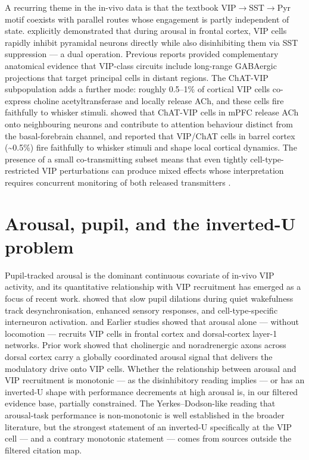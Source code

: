 \documentclass[11pt]{article}
\let\origrightarrow\rightarrow
\def\rightarrow{\ensuremath{\origrightarrow}}
\begin{document}
A recurring theme in the in-vivo data is that the textbook VIP\rightarrow SST\rightarrow Pyr motif coexists with parallel routes whose engagement is partly independent of state. \citet{Garciajuncoclemente2017} explicitly demonstrated that during arousal in frontal cortex, VIP cells rapidly inhibit pyramidal neurons directly while also disinhibiting them via SST suppression --- a dual operation. Previous reports \citep{Lee2014b} provided complementary anatomical evidence that VIP-class circuits include long-range GABAergic projections that target principal cells in distant regions. The ChAT-VIP subpopulation \citep{Dudai2020, Granger2020} adds a further mode: roughly 0.5--1\% of cortical VIP cells co-express choline acetyltransferase and locally release ACh, and these cells fire faithfully to whisker stimuli. \citet{Obermayer2019} showed that ChAT-VIP cells in mPFC release ACh onto neighbouring neurons and contribute to attention behaviour distinct from the basal-forebrain channel, and \citet{Dudai2020} reported that VIP/ChAT cells in barrel cortex ({\textasciitilde}0.5\%) fire faithfully to whisker stimuli and shape local cortical dynamics. The presence of a small co-transmitting subset means that even tightly cell-type-restricted VIP perturbations can produce mixed effects whose interpretation requires concurrent monitoring of both released transmitters \citep{Obermayer2019, Dudai2020, Granger2020}.

\section{Arousal, pupil, and the inverted-U problem}

Pupil-tracked arousal is the dominant continuous covariate of in-vivo VIP activity, and its quantitative relationship with VIP recruitment has emerged as a focus of recent work. \citet{Reimer2014} showed that slow pupil dilations during quiet wakefulness track desynchronisation, enhanced sensory responses, and cell-type-specific interneuron activation. \citet{Garciajuncoclemente2017} and Earlier studies \citep{Munoz2017} showed that arousal alone --- without locomotion --- recruits VIP cells in frontal cortex and dorsal-cortex layer-1 networks. Prior work \citep{Collins2023} showed that cholinergic and noradrenergic axons across dorsal cortex carry a globally coordinated arousal signal that delivers the modulatory drive onto VIP cells. Whether the relationship between arousal and VIP recruitment is monotonic --- as the disinhibitory reading implies --- or has an inverted-U shape with performance decrements at high arousal is, in our filtered evidence base, partially constrained. The Yerkes--Dodson-like reading that arousal-task performance is non-monotonic is well established in the broader literature, but the strongest statement of an inverted-U specifically at the VIP cell --- and a contrary monotonic statement --- comes from sources outside the filtered citation map.
\end{document}
